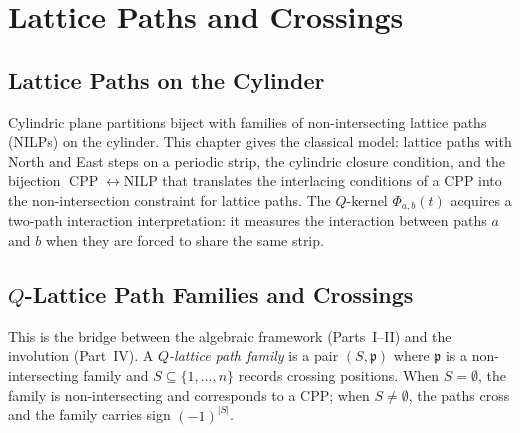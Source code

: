 \documentclass[11pt]{report}
\newcommand{\CPP}{\operatorname{CPP}}
\theoremstyle{plain}
\theoremstyle{definition}
\begin{document}


\part{Lattice Paths and Crossings}
\label{part:lattice-paths}


\chapter{Lattice Paths on the Cylinder}
\label{ch:lattice-paths}

Cylindric plane partitions biject with families of
non-intersecting lattice paths (NILPs) on the cylinder.
This chapter gives the classical model: lattice paths
with North and East steps on a periodic strip, the
cylindric closure condition, and the bijection
$\CPP \leftrightarrow \text{NILP}$ that translates the
interlacing conditions of a CPP into the non-intersection
constraint for lattice paths.  The $Q$-kernel
$\Phi_{a,b}(t)$ acquires a two-path interaction
interpretation: it measures the interaction between paths
$a$ and $b$ when they are forced to share the same strip.




\chapter{$Q$-Lattice Path Families and Crossings}
\label{ch:crossings}

This is the bridge between the algebraic framework
(Parts~I--II) and the involution (Part~IV).  A
\emph{$Q$-lattice path family} is a pair $(S, \mathfrak{p})$
where $\mathfrak{p}$ is a non-intersecting family and
$S \subseteq \{1, \ldots, n\}$ records crossing positions.
When $S = \emptyset$, the family is non-intersecting and
corresponds to a CPP; when $S \neq \emptyset$, the paths
cross and the family carries sign $(-1)^{|S|}$.
\end{document}
